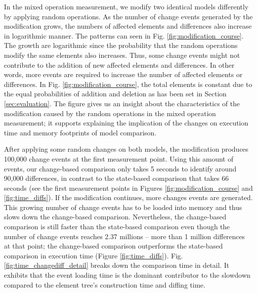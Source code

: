 \documentclass{jot}
\begin{document}
In the mixed operation measurement, we modify two identical models differently by applying random operations. As the number of change events generated by the modification grows, the numbers of affected elements and differences also increase in logarithmic manner. The patterns can seen in Fig. \ref{fig:modification_course}. The growth are logarithmic since the probability that the random operations modify the same elements also increases. Thus, some change events might not contribute to the addition of new affected elements and differences. In other words, more events are required to increase the number of affected elements or differences. In Fig. \ref{fig:modification_course}, the total elements is constant due to the equal probabilities of addition and deletion as has been set in Section \ref{sec:evaluation}. The figure gives us an insight about the characteristics of the modification caused by the random operations in the mixed operation measurement; it supports explaining the implication of the changes on execution time and memory footprints of model comparison.

After applying some random changes on both models, the modification produces 100,000 change events at the first measurement point. Using this amount of events, our change-based comparison only takes 5 seconds to identify around 90,000 differences, in contrast to the state-based comparison that takes 66 seconds (see the first measurement points in Figures \ref{fig:modification_course} and \ref{fig:time_diffs}). If the modification continues, more changes events are generated. This growing number of change events has to be loaded into memory and thus slows down the change-based comparison. Nevertheless, the change-based comparison is still faster than the state-based comparison even though the number of change events reaches 2.37 millions -- more than 1 million differences at that point; the change-based comparison outperforms the state-based comparison in execution time (Figure \ref{fig:time_diffs}). Fig. \ref{fig:time_changediff_detail} breaks down the comparison time in detail. It exhibits that the event loading time is the dominant contributor to the slowdown compared to the element tree's construction time and diffing time. 
\end{document}
